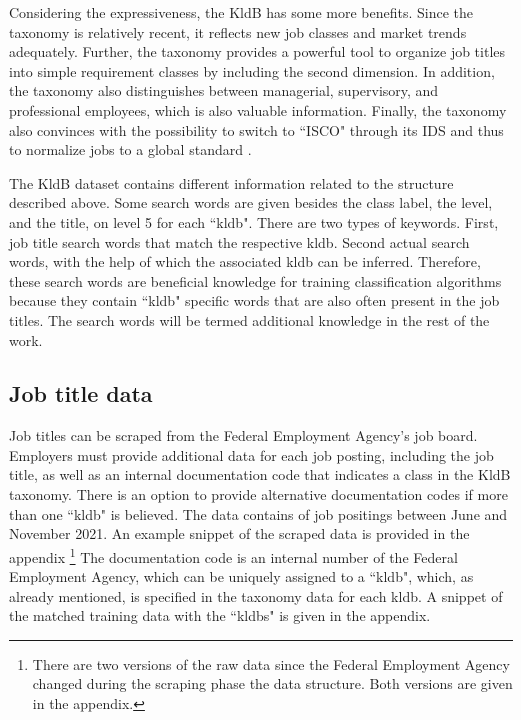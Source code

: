 \documentclass[12pt, a4paper, titlepage]{article}
\begin{document}
Considering the expressiveness, the \ac{KldB} has some more benefits. Since the taxonomy is relatively recent, it reflects new job classes and market trends adequately. Further, the taxonomy provides a powerful tool to organize job titles into simple requirement classes by including the second dimension. In addition, the taxonomy also distinguishes between managerial, supervisory, and professional employees, which is also valuable information. Finally, the taxonomy also convinces with the possibility to switch to ``\ac{ISCO}" through its IDS and thus to normalize jobs to a global standard \citep{Bundesagentur2011b}. 
  
The \ac{KldB} dataset contains different information related to the structure described above. Some search words are given besides the class label, the level, and the title, on level 5 for each ``kldb". There are two types of keywords. First, job title search words that match the respective kldb. Second actual search words, with the help of which the associated kldb can be inferred. Therefore, these search words are beneficial knowledge for training classification algorithms because they contain ``kldb" specific words that are also often present in the job titles. The search words will be termed additional knowledge in the rest of the work. 
 
\subsection{Job title data}
Job titles can be scraped from the Federal Employment Agency's job board. Employers must provide additional data for each job posting, including the job title, as well as an internal documentation code that indicates a class in the \ac{KldB} taxonomy. There is an option to provide alternative documentation codes if more than one ``kldb" is believed. The data contains of job positings between June and November 2021. An example snippet of the scraped data is provided in the appendix \footnote{There are two versions of the raw data since the Federal Employment Agency changed during the scraping phase the data structure. Both versions are given in the appendix.} The documentation code is an internal number of the Federal Employment Agency, which can be uniquely assigned to a ``kldb", which, as already mentioned, is specified in the taxonomy data for each kldb. A snippet of the matched training data with the ``kldbs" is given in the appendix.
\end{document}
